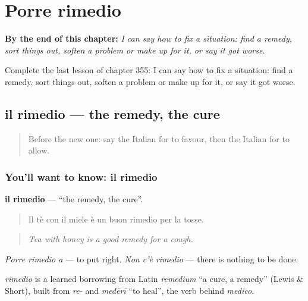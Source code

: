 
\chapter{Porre rimedio}
\label{ch:it-porre-rimedio}

\begin{chapteropening}
\textbf{By the end of this chapter:} \emph{I can say how to fix a situation: find a remedy, sort things out, soften a problem or make up for it, or say it got worse.}

Complete the last lesson of chapter 355: I can say how to fix a situation: find a remedy, sort things out, soften a problem or make up for it, or say it got worse.
\end{chapteropening}

\section[il rimedio]{il rimedio — the remedy, the cure}

\label{lesson:IT-C355-rimedio}



\begin{quote}
Before the new one: say the Italian for to favour, then the Italian for to allow.
\end{quote}

\subsection*{You'll want to know: il rimedio}
\textbf{il rimedio} — \textquotedblleft{}the remedy, the cure\textquotedblright{}.

\begin{quote}
Il tè con il miele è un buon rimedio per la tosse.
\end{quote}

\begin{quote}
\emph{Tea with honey is a good remedy for a cough.}
\end{quote}

\emph{Porre rimedio a} — to put right. \emph{Non c'è rimedio} — there is nothing to be done.

\begin{cousinweb}
\emph{rimedio} is a learned borrowing from Latin \emph{remedium} \textquotedblleft{}a cure, a remedy\textquotedblright{} (Lewis \& Short), built from \emph{re-} and \emph{medērī} \textquotedblleft{}to heal\textquotedblright{}, the verb behind \emph{medico}.
\end{cousinweb}

